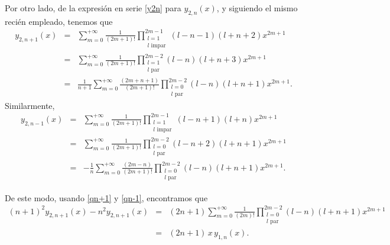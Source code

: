 
Por otro lado, de la expresión en serie \eqref{y2n} para $y_{2,n}(x)$, y  siguiendo el mismo recién empleado, tenemos que
\begin{eqnarray}
y_{2,n+1}(x)&=&\sum_{m= 0}^{+\infty}\frac{1}{(2m+1)!}
\prod_{\substack{l=1 \\ l \text{ impar}}}^{2m-1}
(l-n-1)(l+n+2)x^{2m+1}\\
&=&\sum_{m= 0}^{+\infty}\frac{1}{(2m+1)!}
\prod_{\substack{l=1 \\ l \text{ par}}}^{2m-2}
(l-n)(l+n+3)x^{2m+1}\\
&=&\frac{1}{n+1}\sum_{m= 0}^{+\infty}\frac{(2m+n+1)}{(2m+1)!}
\prod_{\substack{l=0 \\ l \text{ par}}}^{2m-2}
(l-n)(l+n+1)x^{2m+1}. \label{qn+1}
\end{eqnarray}
Similarmente, 
\begin{eqnarray}
y_{2,n-1}(x)&=&\sum_{m= 0}^{+\infty}\frac{1}{(2m+1)!}
\prod_{\substack{l=1 \\ l \text{ impar}}}^{2m-1}
 (l-n+1)(l+n)x^{2m+1}\\
&=&\sum_{m= 0}^{+\infty}\frac{1}{(2m+1)!}
\prod_{\substack{l=0 \\ l \text{ par}}}^{2m-2}
 (l-n+2)(l+n+1)x^{2m+1}\\
 &=&-\frac{1}{n}\sum_{m= 0}^{+\infty}\frac{(2m-n)}{(2m+1)!}
\prod_{\substack{l=0 \\ l \text{ par}}}^{2m-2}
 (l-n)(l+n+1)x^{2m+1}. \label{qn-1}
\end{eqnarray}

De este modo, usando \eqref{qn+1} y \eqref{qn-1}, encontramos que
\begin{eqnarray}
(n+1)^2y_{2,n+1}(x)-n^2y_{2,n+1}(x)&=&(2n+1)\sum_{m= 0}^{+\infty}\frac{1}{(2m)!}
\prod_{\substack{l=0 \\ l \text{ par}}}^{2m-2}
 (l-n)(l+n+1)x^{2m+1} \\
 &=&(2n+1)\,x\,y_{1,n}(x). \label{dos}
\end{eqnarray}

